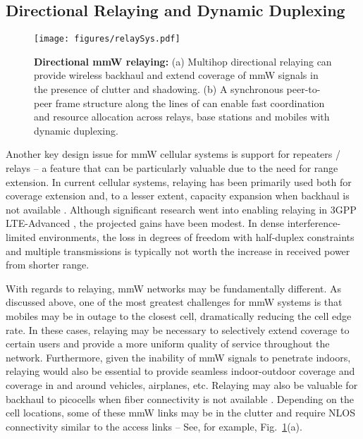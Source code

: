 \documentclass[journal]{IEEEtran}
\begin{document}
\subsection{Directional Relaying and Dynamic Duplexing} \label{sec:relay}

\begin{figure}
\begin{center}
\texttt{[image: figures/relaySys.pdf]}
\end{center}
\caption{\textbf{Directional mmW relaying:} (a) Multihop directional
relaying can provide wireless backhaul and
extend coverage of mmW signals in the presence of clutter and shadowing.
(b) A synchronous peer-to-peer frame structure along the lines of
\cite{FlashLinq:10-allerton} can enable
fast coordination and resource allocation across
relays, base stations and mobiles with dynamic duplexing. }
\label{fig:relaySys}
\end{figure}


Another key design issue for mmW cellular systems is support
for repeaters / relays -- a feature that can be particularly valuable
due to the need for range extension.
In current cellular systems,
relaying has been primarily used both for coverage extension
and, to a lesser extent, capacity expansion when backhaul is not available
\cite{SoLiang:05,SchoenenZW:08,BouSalehRRH:09}.
Although significant research went into enabling relaying in 3GPP
 LTE-Advanced \cite{peters2009relay}, the projected gains
have been modest.  In dense interference-limited environments,
the loss in degrees of freedom with half-duplex constraints and multiple transmissions
is typically not worth the increase in received power from shorter range.

With regards to relaying, mmW networks may be fundamentally different.
As discussed above, one of the most greatest challenges for mmW systems
is that mobiles may be in outage to the closest cell, dramatically reducing
the cell edge rate.
In these cases, relaying may be necessary to selectively
extend coverage to certain users and provide
a more uniform quality of service throughout the network.
Furthermore, given the inability of mmW signals to penetrate indoors,
relaying would also be essential to provide seamless indoor-outdoor coverage
and coverage in and around vehicles, airplanes, etc.
Relaying may also be valuable for backhaul to picocells when
fiber connectivity is not available
\cite{EricssonBackhaul:13,NGNM-Backhaul:12-short,ECC-Backhaul:12}.
Depending on the cell locations,
some of these mmW links may be in the clutter and require NLOS connectivity
similar to the access links -- See, for example, Fig.~\ref{fig:relaySys}(a).
\end{document}
